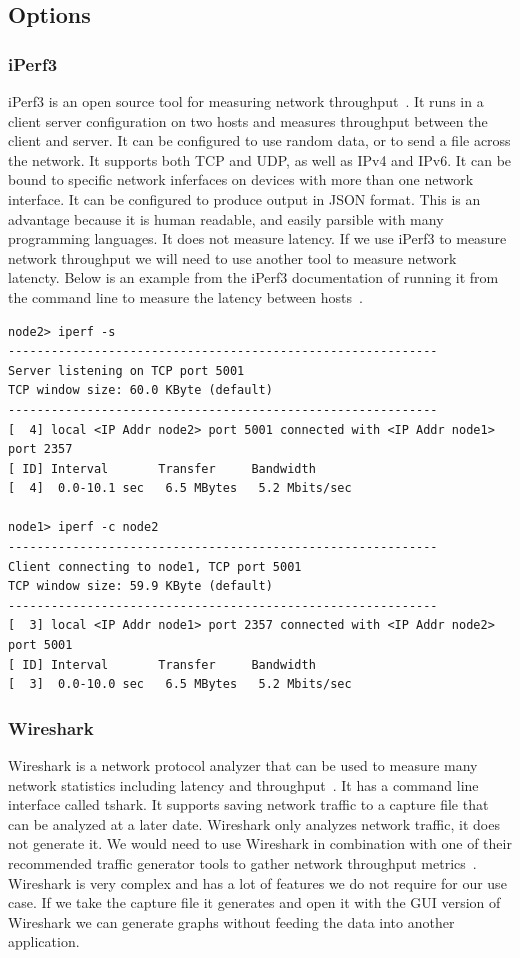 \documentclass[10pt,letterpaper,onecolumn,draftclsnofoot]{IEEEtran}
\begin{document}
\subsection{Options}

\subsubsection{iPerf3}
iPerf3 is an open source tool for measuring network throughput~\cite{iperf}.
It runs in a client server configuration on two hosts and measures throughput between the client and server.
It can be configured to use random data, or to send a file across the network.
It supports both TCP and UDP, as well as IPv4 and IPv6.
It can be bound to specific network inferfaces on devices with more than one network interface.
It can be configured to produce output in JSON format. 
This is an advantage because it is human readable, and easily parsible with many programming languages.
It does not measure latency. 
If we use iPerf3 to measure network throughput we will need to use another tool to measure network latencty.
Below is an example from the iPerf3 documentation of running it from the command line to measure the latency between hosts~\cite{iperf}.
\begin{lstlisting}[caption = Sample iPerf 3 usage, basicstyle=\ttfamily]
node2> iperf -s
------------------------------------------------------------
Server listening on TCP port 5001
TCP window size: 60.0 KByte (default)
------------------------------------------------------------
[  4] local <IP Addr node2> port 5001 connected with <IP Addr node1> port 2357
[ ID] Interval       Transfer     Bandwidth
[  4]  0.0-10.1 sec   6.5 MBytes   5.2 Mbits/sec

node1> iperf -c node2
------------------------------------------------------------
Client connecting to node1, TCP port 5001
TCP window size: 59.9 KByte (default)
------------------------------------------------------------
[  3] local <IP Addr node1> port 2357 connected with <IP Addr node2> port 5001
[ ID] Interval       Transfer     Bandwidth
[  3]  0.0-10.0 sec   6.5 MBytes   5.2 Mbits/sec
\end{lstlisting}


\subsubsection{Wireshark}
Wireshark is a network protocol analyzer that can be used to measure many network statistics including latency and throughput~\cite{wireshark}. 
It has a command line interface called tshark.
It supports saving network traffic to a capture file that can be analyzed at a later date.
Wireshark only analyzes network traffic, it does not generate it.
We would need to use Wireshark in combination with one of their recommended traffic generator tools to gather network throughput metrics~\cite{wireshark-tools}.
Wireshark is very complex and has a lot of features we do not require for our use case.
If we take the capture file it generates and open it with the GUI version of Wireshark we can generate graphs without feeding the data into another application.
\end{document}
